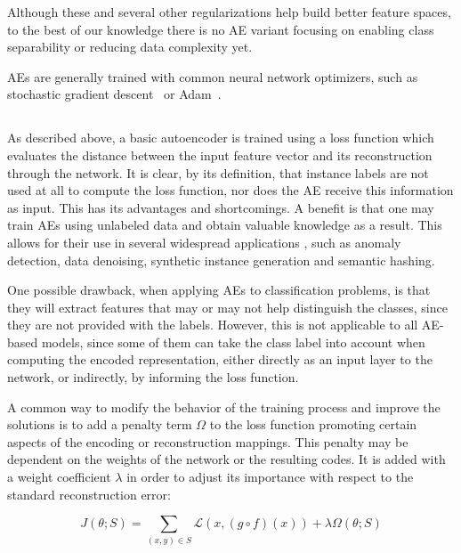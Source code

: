 \fi Although these and several other regularizations help build better feature spaces, to the best of our knowledge there is no AE variant focusing on enabling class separability or reducing data complexity yet.

AEs are generally trained with common neural network optimizers, such as stochastic gradient descent~ or Adam~. 

\subsection{}

As described above, a basic autoencoder is trained using a loss function which evaluates the distance between the input feature vector and its reconstruction through the network. It is clear, by its definition, that instance labels are not used at all to compute the loss function, nor does the AE receive this information as input. This has its advantages and shortcomings. A benefit is that one may train AEs using unlabeled data and obtain valuable knowledge as a result. This allows for their use in several widespread applications , such as anomaly detection, data denoising, synthetic instance generation and semantic hashing.

One possible drawback, when applying AEs to classification problems, is that they will extract features that may or may not help distinguish the classes, since they are not provided with the labels. However, this is not applicable to all AE-based models, since some of them can take the class label into account when computing the encoded representation, either directly as an input layer to the network, or indirectly, by informing the loss function.

A common way to modify the behavior of the training process and improve the solutions is to add a penalty term $\Omega$ to the loss function promoting certain aspects of the encoding or reconstruction mappings. This penalty may be dependent on the weights of the network or the resulting codes. It is added with a weight coefficient $\lambda$ in order to adjust its importance with respect to the standard reconstruction error:

\begin{equation}J\left(\theta;S\right)=\sum_{(x,y)\in S}\mathcal L\left(x,\left(g\circ f\right)\left(x\right)\right) + \lambda\Omega\left(\theta;S\right)\end{equation}

